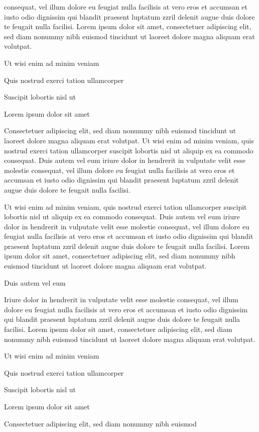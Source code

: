 \documentclass[11pt,twoside]{article}\makeatletter
\begin{document}
      consequat, vel illum dolore eu feugiat nulla facilisis at vero eros et
      accumsan et iusto odio dignissim qui blandit praesent luptatum zzril
      delenit augue duis dolore te feugait nulla facilisi. Lorem ipsum dolor
      sit amet, consectetuer adipiscing elit, sed diam nonummy nibh euismod
      tincidunt ut laoreet dolore magna aliquam erat volutpat. \par Ut wisi enim ad minim veniam\par Quis nostrud exerci tation ullamcorper \par Suscipit lobortis nisl ut \par Lorem ipsum dolor sit amet\par Consectetuer adipiscing elit, sed diam nonummy nibh euismod
      tincidunt ut laoreet dolore magna aliquam erat volutpat. Ut wisi enim
      ad minim veniam, quis nostrud exerci tation ullamcorper suscipit
      lobortis nisl ut aliquip ex ea commodo consequat. Duis autem vel eum
      iriure dolor in hendrerit in vulputate velit esse molestie consequat,
      vel illum dolore eu feugiat nulla facilisis at vero eros et accumsan
      et iusto odio dignissim qui blandit praesent luptatum zzril delenit
      augue duis dolore te feugait nulla facilisi.\par Ut wisi enim ad minim veniam, quis nostrud exerci tation
      ullamcorper suscipit lobortis nisl ut aliquip ex ea commodo
      consequat. Duis autem vel eum iriure dolor in hendrerit in vulputate
      velit esse molestie consequat, vel illum dolore eu feugiat nulla
      facilisis at vero eros et accumsan et iusto odio dignissim qui blandit
      praesent luptatum zzril delenit augue duis dolore te feugait nulla
      facilisi. Lorem ipsum dolor sit amet, consectetuer adipiscing elit,
      sed diam nonummy nibh euismod tincidunt ut laoreet dolore magna
      aliquam erat volutpat. \par Duis autem vel eum \par Iriure dolor in hendrerit in vulputate velit esse molestie
      consequat, vel illum dolore eu feugiat nulla facilisis at vero eros et
      accumsan et iusto odio dignissim qui blandit praesent luptatum zzril
      delenit augue duis dolore te feugait nulla facilisi. Lorem ipsum dolor
      sit amet, consectetuer adipiscing elit, sed diam nonummy nibh euismod
      tincidunt ut laoreet dolore magna aliquam erat volutpat. \par Ut wisi enim ad minim veniam\par Quis nostrud exerci tation ullamcorper \par Suscipit lobortis nisl ut \par Lorem ipsum dolor sit amet\par Consectetuer adipiscing elit, sed diam nonummy nibh euismod
\end{document}
